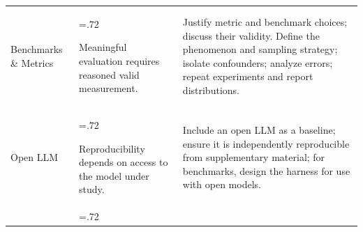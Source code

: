 \documentclass[smallextended]{svjour3}
\newcommand{\must}{\textbf{must}\xspace}
\newcommand{\should}{\textbf{should}\xspace}
\newcommand{\paper}{\emph{paper}\xspace}
\newcommand{\supplementarymaterial}{\emph{supplementary material}\xspace}
\newcommand{\paper}{\emph{paper}\xspace}
\newcommand{\supplementarymaterial}{\emph{supplementary material}\xspace}
\newcommand{\iconM}{\usebox{\iconMbox}\xspace}
\newcommand{\iconS}{\usebox{\iconSbox}\xspace}
\newcommand{\iconM}{●\xspace}
\newcommand{\iconS}{○\xspace}
\newcommand{\annotators}{\hyperref[sec:llms-as-annotators]{\mbox{\emph{LLMs as Annotators}}}\xspace}
\newcommand{\judges}{\hyperref[sec:llms-as-judges]{\mbox{\emph{LLMs as Judges}}}\xspace}
\newcommand{\synthesis}{\hyperref[sec:llms-for-synthesis]{\mbox{\emph{LLMs for Synthesis}}}\xspace}
\newcommand{\subjects}{\hyperref[sec:llms-as-subjects]{\mbox{\emph{LLMs as Subjects}}}\xspace}
\newcommand{\benchmarkingtasks}{\hyperref[sec:benchmarking-llms-for-software-engineering-tasks]{\mbox{\emph{Benchmarking LLMs}}}\xspace}
\newcommand{\annotators}{\href{/study-types/annotators/}{\emph{LLMs as Annotators}}\xspace}
\newcommand{\judges}{\href{/study-types/judges/}{\emph{LLMs as Judges}}\xspace}
\newcommand{\synthesis}{\href{/study-types/synthesis/}{\emph{LLMs for Synthesis}}\xspace}
\newcommand{\subjects}{\href{/study-types/subjects/}{\emph{LLMs as Subjects}}\xspace}
\newcommand{\benchmarkingtasks}{\href{/study-types/benchmarking/}{\emph{Benchmarking LLMs}}\xspace}
\begin{document}
\begin{appendices}
\begin{center}
\begin{tabularx}{\textwidth}{@{}>{\raggedright\arraybackslash}p{2.05cm}>{\hsize=.72\hsize\raggedright\arraybackslash}X>{\hsize=1.28\hsize\raggedright\arraybackslash}X@{}}
Benchmarks \& Metrics & Meaningful evaluation requires reasoned valid measurement. &
\iconM Justify metric and benchmark choices; discuss their validity.
\newline \iconS Define the phenomenon and sampling strategy; isolate confounders; analyze errors; repeat experiments and report distributions. \\
\addlinespace
Open LLM & Reproducibility depends on access to the model under study. &
\iconS Include an open LLM as a baseline; ensure it is independently reproducible from supplementary material; for benchmarks, design the harness for use with open models. \\
\addlinespace

\end{tabularx}
\end{center}
\end{appendices}
\end{document}
